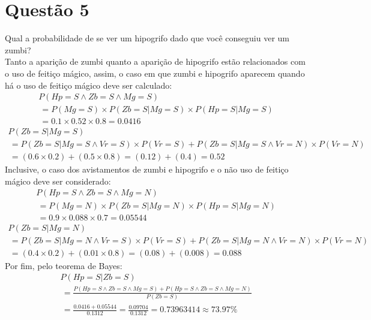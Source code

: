 \documentclass{article}
\begin{document}
    \section*{Questão 5}
        Qual a probabilidade de se ver um hipogrifo dado que você
        conseguiu ver um zumbi? \\
        Tanto a aparição de zumbi quanto a aparição de hipogrifo estão relacionados
        com o uso de feitiço mágico, assim, o caso em que zumbi e hipogrifo aparecem
        quando há o uso de feitiço mágico deve ser calculado:
        \begin{gather*}
            P(Hp=S \land Zb=S \land Mg=S) \\
            \,= P(Mg=S) \times P(Zb=S|Mg=S) \times P(Hp=S|Mg=S) \\
            \,= 0.1 \times 0.52 \times 0.8 = 0.0416
        \end{gather*}
        \begin{gather*}
            P(Zb=S|Mg=S) \\
            \,= P(Zb=S|Mg=S \land Vr=S) \times P(Vr=S)
            + P(Zb=S|Mg=S \land Vr=N) \times P(Vr=N) \\
            \,= (0.6 \times 0.2) + (0.5 \times 0.8)
            = (0.12) + (0.4) = 0.52
        \end{gather*}
        Inclusive, o caso dos avistamentos de zumbi e hipogrifo e o não uso de
        feitiço mágico deve ser considerado:
        \begin{gather*}
            P(Hp=S \land Zb=S \land Mg=N) \\
            \,= P(Mg=N) \times P(Zb=S|Mg=N) \times P(Hp=S|Mg=N) \\
            \,= 0.9 \times 0.088 \times 0.7 = 0.05544
        \end{gather*}
        \begin{gather*}
            P(Zb=S|Mg=N) \\
            \,= P(Zb=S|Mg=N \land Vr=S) \times P(Vr=S)
            + P(Zb=S|Mg=N \land Vr=N) \times P(Vr=N) \\
            \,= (0.4 \times 0.2) + (0.01 \times 0.8)
            = (0.08) + (0.008) = 0.088
        \end{gather*}
        Por fim, pelo teorema de Bayes:
        \begin{gather*}
            P(Hp=S|Zb=S) \\
            \,= \frac{P(Hp=S \land Zb=S \land Mg=S)
                + P(Hp=S \land Zb=S \land Mg=N)}{P(Zb=S)} \\
            \,= \frac{0.0416 + 0.05544}{0.1312}
            = \frac{0.09704}{0.1312}
            = 0.73963414 \approx  73.97\%
        \end{gather*}
\end{document}
